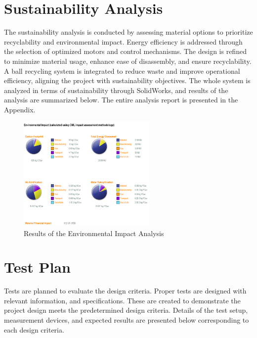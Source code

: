\documentclass[12pt]{report}
\begin{document}
\section{Sustainability Analysis}
The sustainability analysis is conducted by assessing material options to prioritize recyclability and environmental impact. Energy efficiency is addressed through the selection of optimized motors and control mechanisms. The design is refined to minimize material usage, enhance ease of disassembly, and ensure recyclability. A ball recycling system is integrated to reduce waste and improve operational efficiency, aligning the project with sustainability objectives. The whole system is analyzed in terms of sustainability through SolidWorks, and results of the analysis are summarized below. The entire analysis report is presented in the Appendix.

\begin{figure}[h]
    \centering
    \includegraphics[width=0.6\textwidth]{sustaibabilityanalysis.png}
    \caption{Results of the Environmental Impact Analysis}
    \label{fig:sustainabilityanalysis}
\end{figure}

\newpage

\section{Test Plan}
Tests are planned to evaluate the design criteria. Proper tests are designed with relevant information, and specifications. These are created to demonstrate the project design meets the predetermined design criteria. Details of the test setup, measurement devices, and expected results are presented below corresponding to each design criteria.
\end{document}
